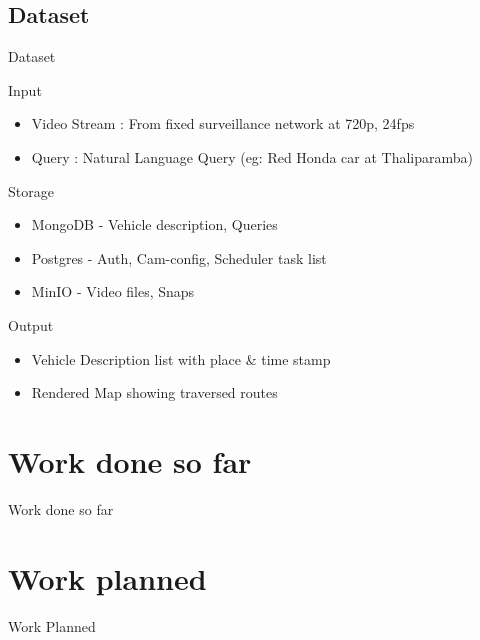 \documentclass{beamer}
\begin{document}
\subsection{Dataset}
\begin{frame}{Dataset}
	\begin{block}{Input}
		\begin{itemize}
			\item Video Stream : From fixed surveillance network at 720p, 24fps
			\item Query : Natural Language Query (eg: Red Honda car at Thaliparamba)
		\end{itemize}
	\end{block}

	\begin{block}{Storage}
		\begin{itemize}
			\item MongoDB - Vehicle description, Queries
			\item Postgres - Auth, Cam-config, Scheduler task list
			\item MinIO - Video files, Snaps
		\end{itemize}	
	\end{block}

	\begin{block}{Output}
		\begin{itemize}
			\item Vehicle Description list with place \& time stamp
			\item Rendered Map showing traversed routes
		\end{itemize}
	\end{block}
\end{frame}


\section{Work done so far}
\begin{frame}{Work done so far}
\end{frame}


\section{Work planned}
\begin{frame}{Work Planned}
\end{frame}
\end{document}
